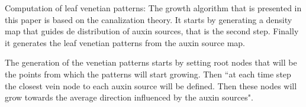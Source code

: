 Computation of leaf venetian patterns:
The growth algorithm that is presented in this paper is based on the canalization theory. It starts by generating a density map that guides de distribution of auxin sources, that is the second step.
Finally it generates the leaf venetian patterns from the auxin source map.

The generation of the venetian patterns starts by setting root nodes that will be the points from which the patterns will start growing. Then ``at each time step the closest vein node to each auxin source will be defined. Then these nodes will grow towards the average direction influenced by the auxin sources".


